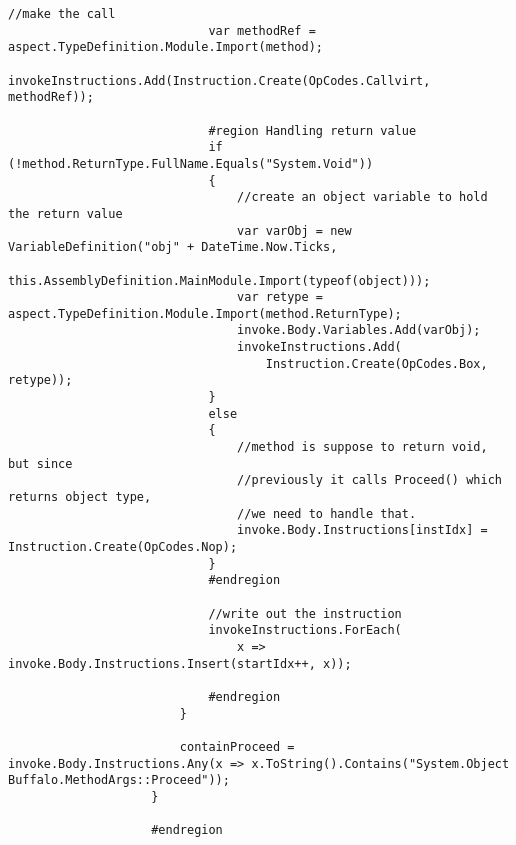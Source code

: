 \begin{lstlisting}[caption={../buffalo/Injectors/MethodAroundInjector.cs}, label=../buffalo/Injectors/MethodAroundInjector.cs, frame=tb, basicstyle=\scriptsize]
                            //make the call
                            var methodRef = aspect.TypeDefinition.Module.Import(method);
                            invokeInstructions.Add(Instruction.Create(OpCodes.Callvirt, methodRef));

                            #region Handling return value
                            if (!method.ReturnType.FullName.Equals("System.Void"))
                            {
                                //create an object variable to hold the return value
                                var varObj = new VariableDefinition("obj" + DateTime.Now.Ticks,
                                    this.AssemblyDefinition.MainModule.Import(typeof(object)));
                                var retype = aspect.TypeDefinition.Module.Import(method.ReturnType);
                                invoke.Body.Variables.Add(varObj);
                                invokeInstructions.Add(
                                    Instruction.Create(OpCodes.Box, retype));
                            }
                            else
                            {
                                //method is suppose to return void, but since
                                //previously it calls Proceed() which returns object type,
                                //we need to handle that.
                                invoke.Body.Instructions[instIdx] = Instruction.Create(OpCodes.Nop);
                            }
                            #endregion

                            //write out the instruction
                            invokeInstructions.ForEach(
                                x => invoke.Body.Instructions.Insert(startIdx++, x));

                            #endregion
                        }

                        containProceed = invoke.Body.Instructions.Any(x => x.ToString().Contains("System.Object Buffalo.MethodArgs::Proceed"));
                    }

                    #endregion


\end{lstlisting}
